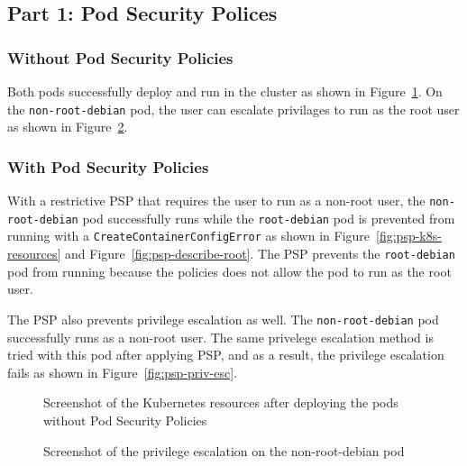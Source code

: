 
\subsection{Part 1: Pod Security Polices}
\subsubsection{Without Pod Security Policies}
Both pods successfully deploy and run in the cluster as shown in Figure~\ref{fig:no-psp-k8s-resources}. On the 
\verb|non-root-debian| pod, the user can escalate privilages to run as the root user as shown in Figure~\ref{fig:no-psp-priv-esc}. 

\subsubsection{With Pod Security Policies}
With a restrictive PSP that requires the user to run as a non-root user, the \verb|non-root-debian| 
pod successfully runs while the \verb|root-debian| pod is prevented from running with a 
\verb|CreateContainerConfigError| as shown in Figure~\ref{fig:psp-k8s-resources} and 
Figure~\ref{fig:psp-describe-root}. The PSP prevents the \verb|root-debian| pod from running because
the policies does not allow the pod to run as the root user.

The PSP also prevents privilege escalation as well. The \verb|non-root-debian| pod successfully runs
as a non-root user. The same privelege escalation method is tried with this pod after applying PSP,
and as a result, the privilege escalation fails as shown in Figure~\ref{fig:psp-priv-esc}.

\onecolumn

\begin{figure}[t]
  \begin{center}
    \vspace{-0.2in}
    \caption{Screenshot of the Kubernetes resources after deploying the pods without Pod Security Policies}
    \label{fig:no-psp-k8s-resources}
  \end{center}
\end{figure}

\begin{figure}[t]
  \begin{center}
    \vspace{-0.2in}
    \caption{Screenshot of the privilege escalation on the non-root-debian pod}
    \label{fig:no-psp-priv-esc}
  \end{center}
\end{figure}

